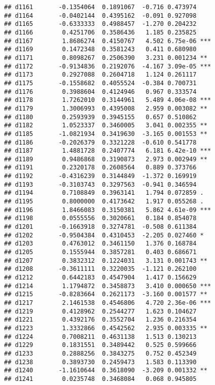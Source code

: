 \documentclass[
]{article}
\begin{document}
\begin{verbatim}
## d1161       -0.1354064  0.1891067  -0.716 0.473974    
## d1164       -0.0402144  0.4395162  -0.091 0.927098    
## d1165       -0.6333333  0.4988457  -1.270 0.204232    
## d1166        0.4251706  0.3586436   1.185 0.235825    
## d1167        1.8686274  0.4150767   4.502 6.75e-06 ***
## d1169        0.1472348  0.3581243   0.411 0.680980    
## d1171        0.8098267  0.2506390   3.231 0.001234 ** 
## d1172       -0.9134836  0.2192076  -4.167 3.09e-05 ***
## d1173        0.2927088  0.2604718   1.124 0.261117    
## d1175       -0.1558682  0.4055524  -0.384 0.700731    
## d1176        0.3988604  0.4124946   0.967 0.333574    
## d1178        1.7262010  0.3144961   5.489 4.06e-08 ***
## d1179        1.3006993  0.4395008   2.959 0.003082 ** 
## d1180        0.2593939  0.3945155   0.657 0.510862    
## d1182        1.0523337  0.3460005   3.041 0.002355 ** 
## d1185       -1.0821934  0.3419630  -3.165 0.001553 ** 
## d1186       -0.2026379  0.3321228  -0.610 0.541778    
## d1187        1.4881728  0.2407774   6.181 6.42e-10 ***
## d1189        0.9486868  0.3190873   2.973 0.002949 ** 
## d1191        0.2320178  0.2608564   0.889 0.373766    
## d1192       -0.4316239  0.3144849  -1.372 0.169919    
## d1193       -0.3103743  0.3297563  -0.941 0.346594    
## d1194        0.7108849  0.3963141   1.794 0.072859 .  
## d1195        0.8000000  0.4173642   1.917 0.055268 .  
## d1196        1.8466083  0.3150381   5.862 4.61e-09 ***
## d1198        0.0555556  0.3020661   0.184 0.854078    
## d1201       -0.1663918  0.3274781  -0.508 0.611384    
## d1202       -0.9504384  0.4310453  -2.205 0.027460 *  
## d1203        0.4763012  0.3461150   1.376 0.168784    
## d1205        0.1555944  0.3857281   0.403 0.686671    
## d1207        0.3832312  0.1224031   3.131 0.001743 ** 
## d1208       -0.3611111  0.3220035  -1.121 0.262100    
## d1212        0.6442183  0.4547904   1.417 0.156629    
## d1214        1.1794872  0.3458873   3.410 0.000650 ***
## d1215       -0.8283664  0.2621173  -3.160 0.001577 ** 
## d1217        2.1461538  0.4546806   4.720 2.36e-06 ***
## d1219        0.4128962  0.2544277   1.623 0.104627    
## d1221        0.4392176  0.3552704   1.236 0.216354    
## d1223        1.3332866  0.4542562   2.935 0.003335 ** 
## d1224        0.7008211  0.4631138   1.513 0.130213    
## d1229        0.1831551  0.3489442   0.525 0.599666    
## d1233        0.2888256  0.3843275   0.752 0.452349    
## d1238        0.3893730  0.2459473   1.583 0.113390    
## d1240       -1.1610644  0.3618090  -3.209 0.001332 ** 
## d1241        0.0235748  0.3468084   0.068 0.945805    

\end{verbatim}
\end{document}

